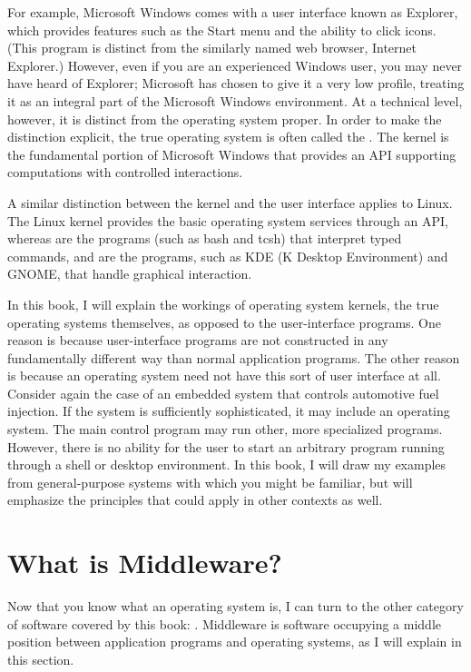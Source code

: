 For example, Microsoft Windows comes with a user interface known as
Explorer, which provides features such as the Start menu and the
ability to click icons.  (This program is distinct from the
similarly named web browser, Internet Explorer.)  However, even if you
are an experienced Windows user, you may never have heard of Explorer;
Microsoft has chosen to give it a very low profile, treating it as an
integral part of the Microsoft Windows environment.  At a technical
level, however, it is distinct from the operating system proper.  In
order to make the distinction explicit, the true operating system is
often called the .  The kernel is the fundamental
portion of Microsoft Windows that provides an API supporting
computations with controlled interactions.

A similar distinction between the kernel and the user interface
applies to Linux.  The Linux kernel provides the basic operating
system services through an API, whereas  are the
programs (such as bash and tcsh) that interpret typed commands, and
 are the programs, such as KDE (K Desktop Environment) and GNOME,
that handle graphical interaction.

In this book, I will explain the workings of operating system
kernels, the true operating systems themselves, as opposed to the
user-interface programs.  One reason is because user-interface programs
are not constructed in any fundamentally different way than normal
application programs.  The other reason is because an operating system
need not have this sort of user interface at all.  Consider again the
case of an embedded system that controls automotive fuel
injection.  If the system is sufficiently sophisticated, it may
include an operating system.  The main control program may run other,
more specialized programs.  However, there is no ability for the user
to start an arbitrary program running through a shell or desktop
environment.  In this book, I will draw my examples from
general-purpose systems with which you might be familiar, but will emphasize
the principles that could apply in other contexts as well.

\section{What is Middleware?}\label{what-is-middleware-section}

Now that you know what an operating system is, I can turn to the other
category of software covered by this book: .  Middleware is software occupying a middle
position between application programs and operating systems, as I will
explain in this section.

